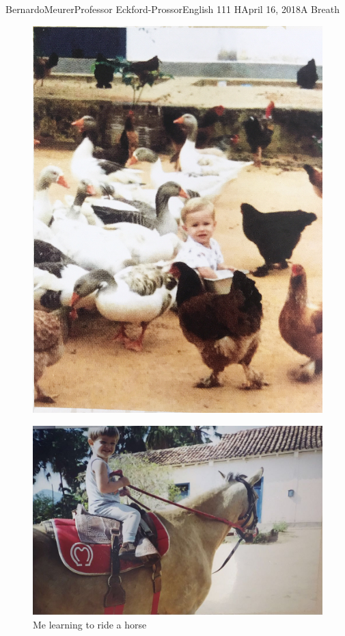 \documentclass[12pt,letterpaper]{article}
\begin{document}
\begin{mla}{Bernardo}{Meurer}{Professor Eckford-Prossor}{English 111 H}{April 16, 2018}{A Breath}
\begin{figure}
\begin{minipage}{.5\textwidth}
			\includegraphics[width=\linewidth]{chickens.jpg}
		\end{minipage}
	\end{figure}

	\begin{figure}[H]
		\centering
		\includegraphics[scale=0.4]{horse.jpeg}
		\caption{Me learning to ride a horse}
	\end{figure}


\end{mla}
\end{document}
